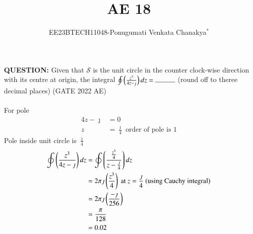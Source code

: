 \documentclass[journal,12pt,onecolumn]{IEEEtran}
\theoremstyle{remark}
\begin{document}
 
 \vspace{3cm}
 \title{\textbf{AE 18}}
 \author{EE23BTECH11048-Ponugumati Venkata Chanakya$^{*}$%
 }
 \maketitle

 \bigskip
 \renewcommand{\thefigure}{\theenumi}
 \renewcommand{\thetable}{\theenumi}
 \textbf{QUESTION:}
 Given that $\mathcal{S}$ is the unit circle in the counter clock-wise direction with its centre at origin, the integral
        $\oint \brak{\frac{z^3}{4z-\jmath}}dz=\rule{1cm}{0.15mm}$
 (round off to theree decimal places)
 \hfill{(GATE 2022 AE)}\\
 \solution\\
 \fi
 For pole
 \begin{align}
 4z-\jmath&=0\\
 z&=\frac{\jmath}{4} \text{  order of pole is 1}
 \end{align}
   Pole inside unit circle is  $\frac{\jmath}{4}$
 \begin{align}
  \oint \left(\frac{z^3}{4z-\jmath}\right)dz&=\oint \left(\frac{\frac{z^3}{4}}{z-\frac{\jmath}{4}}\right)dz\\
  &=2\pi\jmath\left(\frac{z^3}{4}\right)\text{ at }  z=\frac{\jmath}{4}
    \text{ (using Cauchy integral)}\\
    &=2\pi\jmath\left(\frac{-\jmath}{256}\right)\\
    &=\frac{\pi}{128}\\
    &=0.02
  \end{align}
\end{document}
